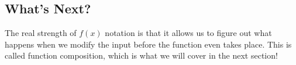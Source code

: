 \documentclass{ximeraXloud}
\begin{document}
    \subsection*{What's Next?}
    
    
    The real strength of $f(x)$ notation is that it allows us to figure out what happens when we modify the input before the function even takes place. This is called function composition, which is what we will cover in the next section!



    
%    
\end{document}
